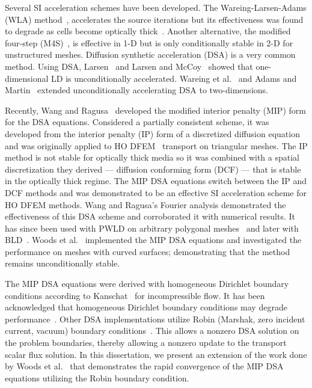 \documentclass{article}
\begin{document}
Several SI acceleration schemes have been developed. The Wareing-Larsen-Adams (WLA) method~\cite{WareingDSADFEM}, accelerates the source iterations but its effectiveness was found to degrade as cells become optically thick~\cite{WarsaFullyConsistentLDDSA}. Another alternative, the modified four-step (M4S)~\cite{AdamsFastIterativeMethods}, is effective in 1-D but is only conditionally stable in 2-D for unstructured meshes. Diffusion synthetic acceleration (DSA) is a very common method. Using DSA, Larsen~\cite{LarsenStableDSATheory} and Larsen and McCoy~\cite{LarsenStableDSANumericalResults} showed that one-dimensional LD is unconditionally accelerated. Wareing et al.~\cite{WareingDSADFEM} and Adams and Martin~\cite{AdamsDSADFEM} extended unconditionally accelerating DSA to two-dimensions.

Recently, Wang and Ragusa~\cite{WangRagusaDSA} developed the modified interior penalty (MIP) form for the DSA equations. Considered a partially consistent scheme, it was developed from the interior penalty (IP) form of a discretized diffusion equation and was originally applied to HO DFEM \SN\ transport on triangular meshes. The IP method is not stable for optically thick media so it was combined with a spatial discretization they derived --- diffusion conforming form (DCF) --- that is stable in the optically thick regime. The MIP DSA equations switch between the IP and DCF methods and was demonstrated to be an effective SI acceleration scheme for HO DFEM methods. Wang and Ragusa's Fourier analysis demonstrated the effectiveness of this DSA scheme and corroborated it with numerical results. It has since been used with PWLD on arbitrary polygonal meshes~\cite{TurcksinDiscontinuousDSA} and later with BLD~\cite{TurcksinDSABLD}. Woods et al.~\cite{WoodsDSA} implemented the MIP DSA equations and investigated the performance on meshes with curved surfaces; demonstrating that the method remains unconditionally stable.

The MIP DSA equations were derived with homogeneous Dirichlet boundary conditions according to Kanschat~\cite{KanschatDGViscousIncompressFlow} for incompressible flow. It has been acknowledged that homogeneous Dirichlet boundary conditions may degrade performance~\cite{WangDissertation}. Other DSA implementations utilize Robin (Marshak, zero incident current, vacuum) boundary conditions~\cite{AdamsDSADFEM, WarsaFullyConsistentLDDSA}. This allows a nonzero DSA solution on the problem boundaries, thereby allowing a nonzero update to the transport scalar flux solution. In this dissertation, we present an extension of the work done by Woods et al.~\cite{WoodsDSA} that demonstrates the rapid convergence of the MIP DSA equations utilizing the Robin boundary condition.
\end{document}
